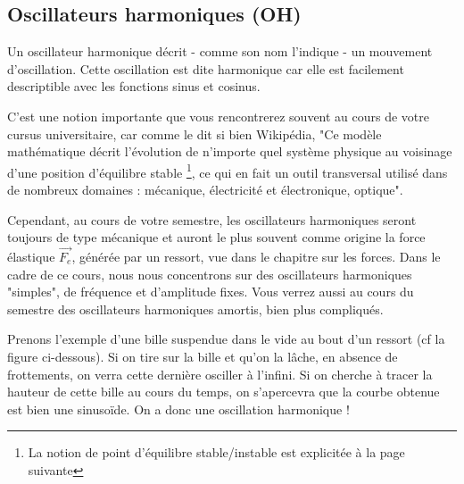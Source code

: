 \documentclass{article}
\newcommand{\x}{\vec x}
\newcommand{\Ressort}[4][]{
\node [minimum size=#2,#1] (ressort) at (#4) {};
\pgfmathparse{#2/#3}\let\pas\pgfmathresult
\draw [decorate,decoration={zigzag,segment length=\pas,amplitude=0.3cm}]
(ressort.east) -- (ressort.west);
}
\begin{document}
\subsection{Oscillateurs harmoniques (OH)} 

\noindent Un oscillateur harmonique décrit - comme son nom l'indique - un mouvement d'oscillation. Cette oscillation est dite harmonique car elle est facilement descriptible avec les fonctions sinus et cosinus.

\noindent C'est une notion importante que vous rencontrerez souvent au cours de votre cursus universitaire, car comme le dit si bien Wikipédia, "Ce modèle mathématique décrit l'évolution de n'importe quel système physique au voisinage d'une position d'équilibre stable \footnote{La notion de point d'équilibre stable/instable est explicitée à la page suivante}, ce qui en fait un outil transversal utilisé dans de nombreux domaines : mécanique, électricité et électronique, optique".

\noindent Cependant, au cours de votre semestre, les oscillateurs harmoniques seront toujours de type mécanique et auront le plus souvent comme origine la force élastique $\vec{F_e}$, générée par un ressort, vue dans le chapitre sur les forces. Dans le cadre de ce cours, nous nous concentrons sur des oscillateurs harmoniques "simples", de fréquence et d'amplitude fixes. Vous verrez aussi au cours du semestre des oscillateurs harmoniques amortis, bien plus compliqués. 

\noindent Prenons l'exemple d'une bille suspendue dans le vide au bout d'un ressort (cf la figure ci-dessous). Si on tire sur la bille et qu'on la lâche, en absence de frottements, on verra cette dernière osciller à l'infini. Si on cherche à tracer la hauteur de cette bille au cours du temps, on s'apercevra que la courbe obtenue est bien une sinusoïde. On a donc une oscillation harmonique !
\begin{center}

\end{center}
\end{document}
